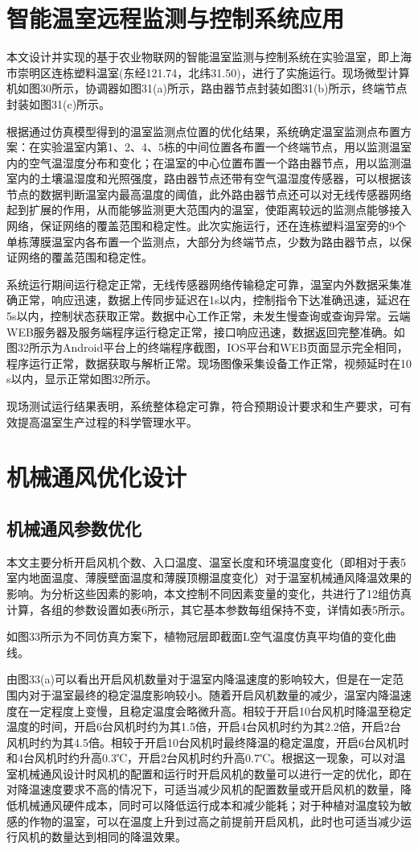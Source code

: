 \section{智能温室远程监测与控制系统应用}
本文设计并实现的基于农业物联网的智能温室监测与控制系统在实验温室，即上海市崇明区连栋塑料温室(东经121.74，北纬31.50)，进行了实施运行。现场微型计算机如图30所示，协调器如图31(a)所示，路由器节点封装如图31(b)所示，终端节点封装如图31(c)所示。

根据通过仿真模型得到的温室监测点位置的优化结果，系统确定温室监测点布置方案：在实验温室内第1、2、4、5栋的中间位置各布置一个终端节点，用以监测温室内的空气温湿度分布和变化；在温室的中心位置布置一个路由器节点，用以监测温室内的土壤温湿度和光照强度，路由器节点还带有空气温湿度传感器，可以根据该节点的数据判断温室内最高温度的阈值，此外路由器节点还可以对无线传感器网络起到扩展的作用，从而能够监测更大范围内的温室，使距离较远的监测点能够接入网络，保证网络的覆盖范围和稳定性。此次实施运行，还在连栋塑料温室旁的9个单栋薄膜温室内各布置一个监测点，大部分为终端节点，少数为路由器节点，以保证网络的覆盖范围和稳定性。

系统运行期间运行稳定正常，无线传感器网络传输稳定可靠，温室内外数据采集准确正常，响应迅速，数据上传同步延迟在1s以内，控制指令下达准确迅速，延迟在5s以内，控制状态获取正常。数据中心工作正常，未发生慢查询或查询异常。云端WEB服务器及服务端程序运行稳定正常，接口响应迅速，数据返回完整准确。如图32所示为Android平台上的终端程序截图，IOS平台和WEB页面显示完全相同，程序运行正常，数据获取与解析正常。现场图像采集设备工作正常，视频延时在10 s以内，显示正常如图32所示。

现场测试运行结果表明，系统整体稳定可靠，符合预期设计要求和生产要求，可有效提高温室生产过程的科学管理水平。

\section{机械通风优化设计}
	\subsection{机械通风参数优化}
	本文主要分析开启风机个数、入口温度、温室长度和环境温度变化（即相对于表5室内地面温度、薄膜壁面温度和薄膜顶棚温度变化）对于温室机械通风降温效果的影响。为分析这些因素的影响，本文控制不同因素变量的变化，共进行了12组仿真计算，各组的参数设置如表6所示，其它基本参数每组保持不变，详情如表5所示。
	
	如图33所示为不同仿真方案下，植物冠层即截面L空气温度仿真平均值的变化曲线。
	
由图33(a)可以看出开启风机数量对于温室内降温速度的影响较大，但是在一定范围内对于温室最终的稳定温度影响较小。随着开启风机数量的减少，温室内降温速度在一定程度上变慢，且稳定温度会略微升高。相较于开启10台风机时降温至稳定温度的时间，开启6台风机时约为其1.5倍，开启4台风机时约为其2.2倍，开启2台风机时约为其4.5倍。相较于开启10台风机时最终降温的稳定温度，开启6台风机时和4台风机时约升高0.3℃，开启2台风机时约升高0.7℃。根据这一现象，可以对温室机械通风设计时风机的配置和运行时开启风机的数量可以进行一定的优化，即在对降温速度要求不高的情况下，可适当减少风机的配置数量或开启风机的数量，降低机械通风硬件成本，同时可以降低运行成本和减少能耗；对于种植对温度较为敏感的作物的温室，可以在温度上升到过高之前提前开启风机，此时也可适当减少运行风机的数量达到相同的降温效果。


